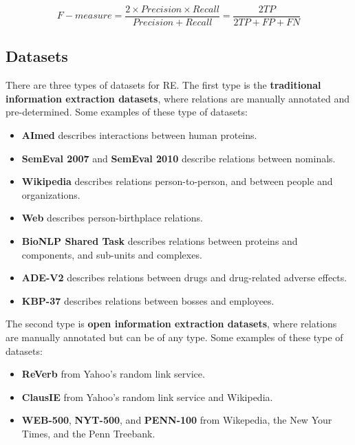 \begin{equation}
F-measure = \frac{2\times Precision\times Recall}{Precision + Recall} = \frac{2 TP}{2 TP + FP + FN}
\label{equation:evaluation}
\end{equation} 


\subsection{Datasets}

There are three types of datasets for RE. The first type is the \textbf{traditional information extraction datasets}, where relations are manually annotated and pre-determined. Some examples of these type of datasets:

\begin{itemize}
    \item \textbf{AImed} \citep{mooney2006subsequence} describes interactions between human proteins.
    \item \textbf{SemEval 2007} \citep{girju2007semeval} and \textbf{SemEval 2010} \citep{hendrickx2010semeval} describe relations between nominals.
    \item \textbf{Wikipedia} \citep{culotta2006integrating} describes relations person-to-person, and between people and organizations. 
    \item \textbf{Web} \citep{bunescu2007learning} describes person-birthplace relations.
    \item \textbf{BioNLP Shared Task} \citep{kim2011overview} describes relations between proteins and components, and sub-units and complexes. 
    \item \textbf{ADE-V2} \citep{gurulingappa2012development} describes relations between drugs and drug-related adverse effects. 
    \item \textbf{KBP-37} \citep{zhang2015relation} describes relations between bosses and employees. 
\end{itemize}

The second type is \textbf{open information extraction datasets}, where relations are manually annotated but can be of any type. Some examples of these type of datasets:

\begin{itemize}
    \item \textbf{ReVerb} \citep{fader2011identifying} from Yahoo's random link service.
    \item \textbf{ClausIE} \citep{del2013clausie} from Yahoo's random link service and Wikipedia.
    \item \textbf{WEB-500}, \textbf{NYT-500}, and \textbf{PENN-100} \citep{mesquita2013effectiveness} from Wikepedia, the New Your Times, and the Penn Treebank. 
\end{itemize}


